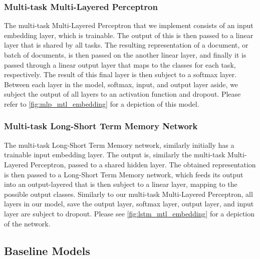 
\subsubsection{Multi-task Multi-Layered Perceptron}

The multi-task Multi-Layered Perceptron that we implement consists of an input embedding layer, which is trainable. The output of this is then passed to a linear layer that is shared by all tasks. The resulting representation of a document, or batch of documents, is then passed on the another linear layer, and finally it is passed through a linear output layer that maps to the classes for each task, respectively. The result of this final layer is then subject to a softmax layer. Between each layer in the model, softmax, input, and output layer aside, we subject the output of all layers to an activation function and dropout. Please refer to \autoref{fig:mlp_mtl_embedding} for a depiction of this model.


\subsubsection{Multi-task Long-Short Term Memory Network}

The multi-task Long-Short Term Memory network, similarly initially has a trainable input embedding layer. The output is, similarly the multi-task Multi-Layered Perceptron, passed to a shared hidden layer. The obtained representation is then passed to a Long-Short Term Memory network, which feeds its output into an output-layered that is then subject to a linear layer, mapping to the possible output classes. Similarly to our multi-task Multi-Layered Perceptron, all layers in our model, save the output layer, softmax layer, output layer, and input layer are subject to dropout. Please see \autoref{fig:lstm_mtl_embedding} for a depiction of the network.

\subsection{Baseline Models}

